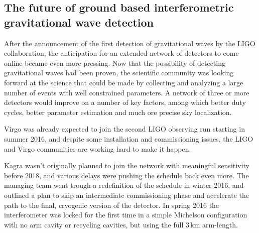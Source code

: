 \subsection{The future of ground based interferometric gravitational wave detection}\label{subsec:future}

After the announcement of the first detection of gravitational waves by the LIGO collaboration, the anticipation for an extended network of detectors to come online became even more pressing. Now that the possibility of detecting gravitational waves had been proven, the scientific community was looking forward at the science that could be made by collecting and analyzing a large number of events with well constrained parameters. A network of three or more detectors would improve on a number of key factors, among which better duty cycles, better parameter estimation and much ore precise sky localization.

Virgo was already expected to join the second LIGO observing run starting in summer 2016, and despite some installation and commissioning issues, the LIGO and Virgo communities are working hard to make it happen.

Kagra wasn't originally planned to join the network with meaningful sensitivity before 2018, and various delays were pushing the schedule back even more. The managing team went trough a redefinition of the schedule in winter 2016, and outlined a plan to skip an intermediate commissioning phase and accelerate the path to the final, cryogenic version of the detector. In spring 2016 the interferometer was locked for the first time in a simple Michelson configuration with no arm cavity or recycling cavities, but using the full 3\,km arm-length.

